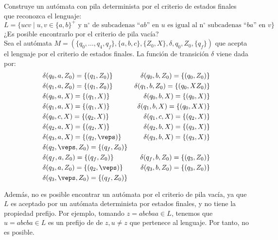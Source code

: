 \begin{ejercicio}\label{ej:1.5.21}
    Construye un autómata con pila determinista por el criterio de estados finales que reconozca el lenguaje:
    \begin{equation*}
        L = \{ucv\mid u,v\in {\{a,b\}}^{+} \text{\ y n$^\circ$ de subcadenas ``}ab \text{'' en\ } u \text{\ es igual al n$^\circ$ subcadenas ``} ba \text{'' en\ }v\}
    \end{equation*}
    ¿Es posible encontrarlo por el criterio de pila vacía?\\

    Sea el autómata $M = (\{q_0,\dots,q_4,q_f\},\{a,b,c\},\{Z_0,X\},\delta,q_0,Z_0,\{q_f\})$ que acepta el lenguaje por el criterio de estados finales.
    La función de transición $\delta$ viene dada por:
    \begin{align*}
        &\delta(q_0,a,Z_0) = \{(q_1,Z_0)\}
        &\delta(q_0,b,Z_0) = \{(q_0,Z_0)\} \\
        &\delta(q_1,a,Z_0) = \{(q_1,Z_0)\} 
        &\delta(q_1,b,Z_0) = \{(q_0,XZ_0)\} \\
        &\delta(q_0,a,X) = \{(q_1,X)\} 
        &\delta(q_0,b,X) = \{(q_0,X)\} \\
        &\delta(q_1,a,X) = \{(q_1,X)\} 
        &\delta(q_1,b,X) = \{(q_0,XX)\} \\
        &\delta(q_0,c,X) = \{(q_2,X)\} 
        &\delta(q_1,c,X) = \{(q_2,X)\} \\
        &\delta(q_2,a,X) = \{(q_2,X)\} 
        &\delta(q_2,b,X) = \{(q_3,X)\} \\
        &\delta(q_3,a,X) = \{(q_2,\veps)\} 
        &\delta(q_3,b,X) = \{(q_3,X)\} \\
        &\delta(q_2,\veps,Z_0) = \{(q_f,Z_0)\} \\
        &\delta(q_f,a,Z_0) = \{(q_f,Z_0)\} 
        &\delta(q_f,b,Z_0) = \{(q_3,Z_0)\} \\
        &\delta(q_3,a,Z_0) = \{(q_2,\veps)\}
        &\delta(q_3,b,Z_0) = \{(q_3,Z_0)\}\\
        &\delta(q_3,\veps,Z_0) = \{(q_f,Z_0)\}
    \end{align*}

    Además, no es posible encontrar un autómata por el criterio de pila vacía, ya que $L$ es aceptado por un autómata determinista por estados finales, y no tiene la propiedad prefijo. Por ejemplo, tomando $z=abcbaa\in L$, tenemos que $u=abcba\in L$ es un prefijo de de $z,u\neq z$ que pertenece al lenguaje. Por tanto, no es posible. 
\end{ejercicio}

